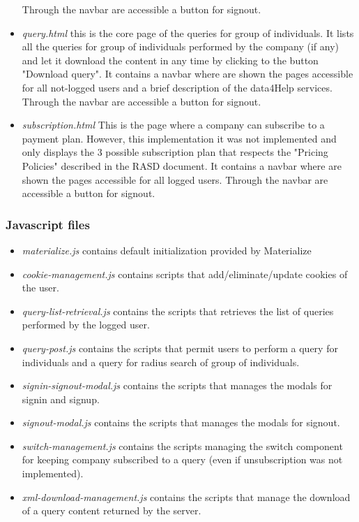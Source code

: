 \begin{itemize}
    Through the navbar are accessible a button for signout.
    \item \textit{query.html} this is the core page of the queries for group of individuals.
    It lists all the queries for group of individuals performed by the company (if any) and let it download the content in any time by clicking to the button "Download query".
    It contains a navbar where are shown the pages accessible for all not-logged users and a brief description of the data4Help services.
    Through the navbar are accessible a button for signout.
    \item \textit{subscription.html} This is the page where a company can subscribe to a payment plan.
    However, this implementation it was not implemented and only displays the 3 possible subscription plan that respects the "Pricing Policies" described in the RASD document.
    It contains a navbar where are shown the pages accessible for all logged users.
    Through the navbar are accessible a button for signout.
\end{itemize}

\subsubsection{Javascript files}
\begin{itemize}
    \item \textit{materialize.js} contains default initialization provided by Materialize
    \item \textit{cookie-management.js} contains scripts that add/eliminate/update cookies of the user.
    \item \textit{query-list-retrieval.js} contains the scripts that retrieves the list of queries performed by the logged user.
    \item \textit{query-post.js} contains the scripts that permit users to perform a query for individuals and a query for radius search of group of individuals.
    \item \textit{signin-signout-modal.js} contains the scripts that manages the modals for signin and signup.
    \item \textit{signout-modal.js} contains the scripts that manages the modals for signout.
    \item \textit{switch-management.js}\textit{} contains the scripts managing the switch component for keeping company subscribed to a query (even if unsubscription was not implemented).
    \item \textit{xml-download-management.js} contains the scripts that manage the download of a query content returned by the server.
\end{itemize}

